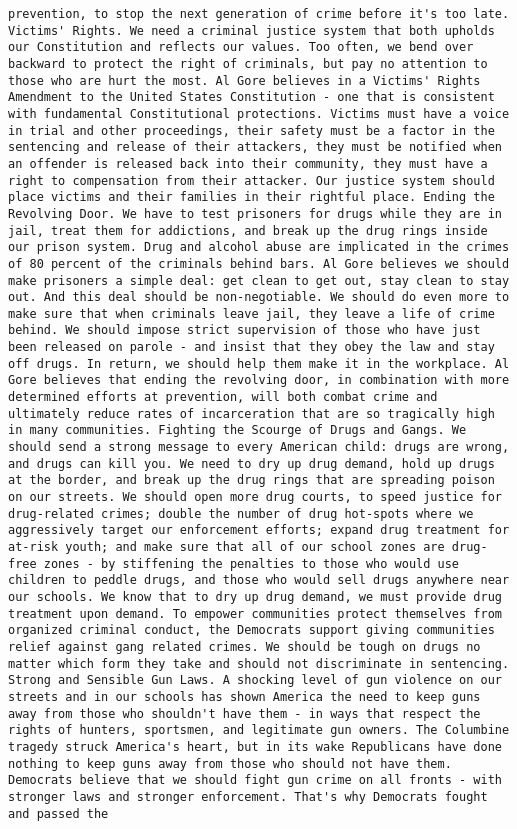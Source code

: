 \documentclass[
]{article}
\begin{document}
\begin{verbatim}
prevention, to stop the next generation of crime before it's too late. Victims' Rights. We need a criminal justice system that both upholds our Constitution and reflects our values. Too often, we bend over backward to protect the right of criminals, but pay no attention to those who are hurt the most. Al Gore believes in a Victims' Rights Amendment to the United States Constitution - one that is consistent with fundamental Constitutional protections. Victims must have a voice in trial and other proceedings, their safety must be a factor in the sentencing and release of their attackers, they must be notified when an offender is released back into their community, they must have a right to compensation from their attacker. Our justice system should place victims and their families in their rightful place. Ending the Revolving Door. We have to test prisoners for drugs while they are in jail, treat them for addictions, and break up the drug rings inside our prison system. Drug and alcohol abuse are implicated in the crimes of 80 percent of the criminals behind bars. Al Gore believes we should make prisoners a simple deal: get clean to get out, stay clean to stay out. And this deal should be non-negotiable. We should do even more to make sure that when criminals leave jail, they leave a life of crime behind. We should impose strict supervision of those who have just been released on parole - and insist that they obey the law and stay off drugs. In return, we should help them make it in the workplace. Al Gore believes that ending the revolving door, in combination with more determined efforts at prevention, will both combat crime and ultimately reduce rates of incarceration that are so tragically high in many communities. Fighting the Scourge of Drugs and Gangs. We should send a strong message to every American child: drugs are wrong, and drugs can kill you. We need to dry up drug demand, hold up drugs at the border, and break up the drug rings that are spreading poison on our streets. We should open more drug courts, to speed justice for drug-related crimes; double the number of drug hot-spots where we aggressively target our enforcement efforts; expand drug treatment for at-risk youth; and make sure that all of our school zones are drug-free zones - by stiffening the penalties to those who would use children to peddle drugs, and those who would sell drugs anywhere near our schools. We know that to dry up drug demand, we must provide drug treatment upon demand. To empower communities protect themselves from organized criminal conduct, the Democrats support giving communities relief against gang related crimes. We should be tough on drugs no matter which form they take and should not discriminate in sentencing. Strong and Sensible Gun Laws. A shocking level of gun violence on our streets and in our schools has shown America the need to keep guns away from those who shouldn't have them - in ways that respect the rights of hunters, sportsmen, and legitimate gun owners. The Columbine tragedy struck America's heart, but in its wake Republicans have done nothing to keep guns away from those who should not have them. Democrats believe that we should fight gun crime on all fronts - with stronger laws and stronger enforcement. That's why Democrats fought and passed the 
\end{verbatim}
\end{document}
